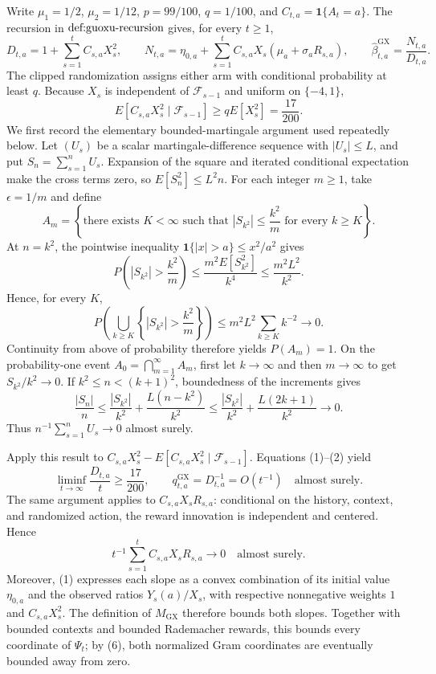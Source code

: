 Write \(\mu _1=1/2\), \(\mu _2=1/12\), \(p=99/100\), \(q=1/100\), and \(C_{t,a}=\mathbf 1\{A_t=a\}\).  The recursion in \(\textnormal{def:guoxu-recursion}\) gives, for every \(t\geq 1\),
\[
 D_{t,a}=1+\sum_{s=1}^t C_{s,a}X_s^2,\qquad
 N_{t,a}=\eta_{0,a}+\sum_{s=1}^t C_{s,a}X_s(\mu_a+\sigma_aR_{s,a}),\qquad
 \widehat\beta^{\mathrm{GX}}_{t,a}=\frac{N_{t,a}}{D_{t,a}}. \tag{1}
\]
The clipped randomization assigns either arm with conditional probability at least \(q\).  Because \(X_s\) is independent of \(\mathcal F_{s-1}\) and uniform on \(\{-4,1\}\),
\[
 E[C_{s,a}X_s^2\mid\mathcal F_{s-1}]
 \geq qE[X_s^2]=\frac{17}{200}. \tag{2}
\]
We first record the elementary bounded-martingale argument used repeatedly below.  Let \((U_s)\) be a scalar martingale-difference sequence with \(|U_s|\leq L\), and put \(S_n=\sum_{s=1}^nU_s\).  Expansion of the square and iterated conditional expectation make the cross terms zero, so \(E[S_n^2]\leq L^2n\).  For each integer \(m\geq1\), take \(\epsilon=1/m\) and define
\[
 A_m=\left\{\text{there exists }K<\infty\text{ such that }
 |S_{k^2}|\leq \frac{k^2}{m}\text{ for every }k\geq K\right\}. \tag{3}
\]
At \(n=k^2\), the pointwise inequality \(\mathbf 1\{|x|>a\}\leq x^2/a^2\) gives
\[
 P\left(|S_{k^2}|>\frac{k^2}{m}\right)
 \leq \frac{m^2E[S_{k^2}^2]}{k^4}
 \leq \frac{m^2L^2}{k^2}. \tag{4}
\]
Hence, for every \(K\),
\[
 P\left(\bigcup_{k\geq K}\left\{|S_{k^2}|>\frac{k^2}{m}\right\}\right)
 \leq m^2L^2\sum_{k\geq K}k^{-2}\longrightarrow0.
\]
Continuity from above of probability therefore yields \(P(A_m)=1\).  On the probability-one event \(A_0=\bigcap_{m=1}^{\infty}A_m\), first let \(k\to\infty\) and then \(m\to\infty\) to get \(S_{k^2}/k^2\to0\).  If \(k^2\leq n<(k+1)^2\), boundedness of the increments gives
\[
 \frac{|S_n|}{n}
 \leq \frac{|S_{k^2}|}{k^2}+\frac{L(n-k^2)}{k^2}
 \leq \frac{|S_{k^2}|}{k^2}+\frac{L(2k+1)}{k^2}\longrightarrow0. \tag{5}
\]
Thus \(n^{-1}\sum_{s=1}^nU_s\to0\) almost surely.

Apply this result to \(C_{s,a}X_s^2-E[C_{s,a}X_s^2\mid\mathcal F_{s-1}]\).  Equations (1)--(2) yield
\[
 \liminf_{t\to\infty}\frac{D_{t,a}}t\geq\frac{17}{200},
 \qquad q^{\mathrm{GX}}_{t,a}=D_{t,a}^{-1}=O(t^{-1})
 \quad\text{almost surely}. \tag{6}
\]
The same argument applies to \(C_{s,a}X_sR_{s,a}\): conditional on the history, context, and randomized action, the reward innovation is independent and centered.  Hence
\[
 t^{-1}\sum_{s=1}^tC_{s,a}X_sR_{s,a}\longrightarrow0
 \quad\text{almost surely}. \tag{7}
\]
Moreover, (1) expresses each slope as a convex combination of its initial value \(\eta_{0,a}\) and the observed ratios \(Y_s(a)/X_s\), with respective nonnegative weights \(1\) and \(C_{s,a}X_s^2\).  The definition of \(M_{\mathrm{GX}}\) therefore bounds both slopes.  Together with bounded contexts and bounded Rademacher rewards, this bounds every coordinate of \(\Psi_t\); by (6), both normalized Gram coordinates are eventually bounded away from zero.

